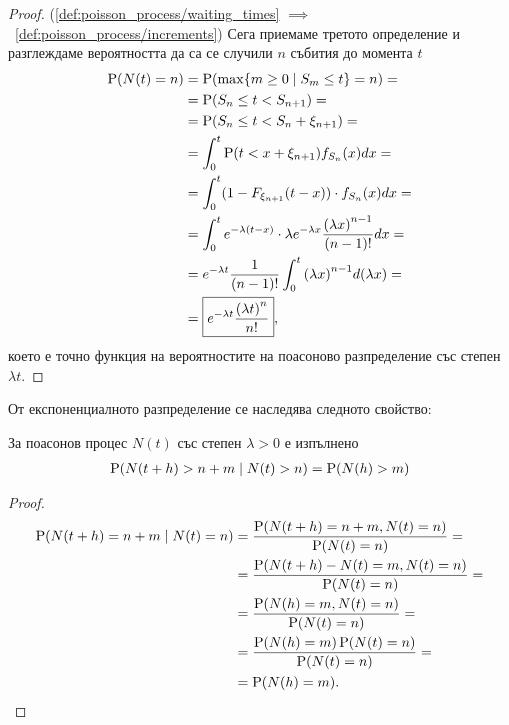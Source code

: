 \documentclass[numbers=endperiod, bibliography=totocnumbered]{scrartcl}
\begin{document}
\begin{proof}
  (\ref{def:poisson_process/waiting_times} \( \implies \)~\ref{def:poisson_process/increments}) Сега приемаме третото определение и разглеждаме вероятността да са се случили \( n \) събития до момента \( t \)
  \begin{align*}
    \operatorname{P}(N(t) = n)
    &=
    \operatorname{P}(\max \{ m \geq 0 \mid S_m \leq t \} = n)
    = \\ &=
    \operatorname{P}(S_n \leq t < S_{n+1})
    = \\ &=
    \operatorname{P}(S_n \leq t < S_n + \xi_{n+1})
    = \\ &=
    \int_0^t \operatorname{P}(t < x + \xi_{n+1}) f_{S_n} (x) dx
    = \\ &=
    \int_0^t (1 - F_{\xi_{n+1}} (t - x)) \cdot f_{S_n} (x) dx
    = \\ &=
    \int_0^t e^{-\lambda (t-x)} \cdot \lambda e^{-\lambda x} \frac {{(\lambda x)}^{n-1}} {(n-1)!} dx
    = \\ &=
    e^{-\lambda t} \frac 1 {(n-1)!} \int_0^t {(\lambda x)}^{n-1} d(\lambda x)
    = \\ &=
    \boxed{e^{-\lambda t} \frac {{(\lambda t)}^n} {n!}},
  \end{align*}
  което е точно функция на вероятностите на поасоново разпределение със степен \( \lambda t \).
\end{proof}

От експоненциалното разпределение се наследява следното свойство:
\begin{proposition}
  За поасонов процес \( N(t) \) със степен \( \lambda > 0 \) е изпълнено
  \begin{align*}
    \operatorname{P}(N(t+h) > n + m \mid N(t) > n)
    =
    \operatorname{P}(N(h) > m)
  \end{align*}
\end{proposition}
\begin{proof}
  \begin{align*}
    \operatorname{P}(N(t+h) = n + m \mid N(t) = n)
    &=
    \frac {\operatorname{P}(N(t+h) = n + m, N(t) = n)} {\operatorname{P}(N(t) = n)}
    = \\ &=
    \frac {\operatorname{P}(N(t+h) - N(t) = m, N(t) = n)} {\operatorname{P}(N(t) = n)}
    = \\ &=
    \frac {\operatorname{P}(N(h) = m, N(t) = n)} {\operatorname{P}(N(t) = n)}
    = \\ &=
    \frac {\operatorname{P}(N(h) = m) \operatorname{P}(N(t) = n)} {\operatorname{P}(N(t) = n)}
    = \\ &=
    \operatorname{P}(N(h) = m).
  \end{align*}
\end{proof}
\end{document}
